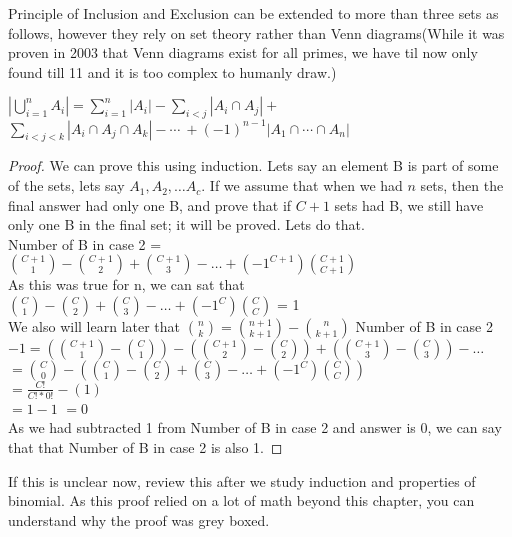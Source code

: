 \begin{mdframed}[backgroundcolor=gray!20]
Principle of Inclusion and Exclusion can be extended to more than three sets as follows, however they rely on set theory rather than Venn diagrams(While it was proven in 2003 that Venn diagrams exist for all primes, we have til now only found till 11 and it is too complex to humanly draw.)
\begin{theorem}
    $\left|\bigcup_{i=1}^n A_i\right|=\sum_{i=1}^n\left|A_i\right| -\sum_{i < j}\left|A_i\cap A_j\right| +$ \\
    $ \sum_{i<j<k}\left|A_i\cap A_j\cap A_k\right|-\cdots\ +(-1)^{n-1} \left|A_1\cap\cdots\cap A_n\right|{}$
\end{theorem}
\begin{proof}
We can prove this using induction. Lets say an element B is part of  some of the sets, lets say $A_1, A_2, \dots A_c$. If we assume that when we had $n$ sets, then the final answer had only one B, and prove that if $C+1$ sets had B, we still have only one B in the final set; it will be proved. Lets do that.\\
Number of B in case 2 = $\binom{C+1}{1} - \binom{C+1}{2} + \binom{C+1}{3} - \dots +(-1^{C+1})\binom{C+1}{C+1}$ \\
As this was true for n, we can sat that $\binom{C}{1} - \binom{C}{2} + \binom{C}{3} - \dots +(-1^{C})\binom{C}{C}$ = 1 \\
We also will learn later that $\binom{n}{k}=\binom{n+1}{k+1}-\binom{n}{k+1}$
Number of B in case 2 $- 1 = (\binom{C+1}{1}-\binom{C}{1}) - (\binom{C+1}{2}-\binom{C}{2}) + (\binom{C+1}{3}-\binom{C}{3}) - \dots$ \\
$= \binom{C}{0}-(\binom{C}{1} - \binom{C}{2} + \binom{C}{3} - \dots +(-1^{C})\binom{C}{C})$\\
$= \frac{C!}{C!*0!}-(1)$\\
$=1-1$
$=0$\\
As we had subtracted 1 from Number of B in case 2 and answer is 0, we can say that that Number of B in case 2 is also 1.
\end{proof}
If this is unclear now, review this after we study induction and properties of binomial. As this proof relied on a lot of math beyond this chapter, you can understand why the proof was grey boxed.
\end{mdframed}
